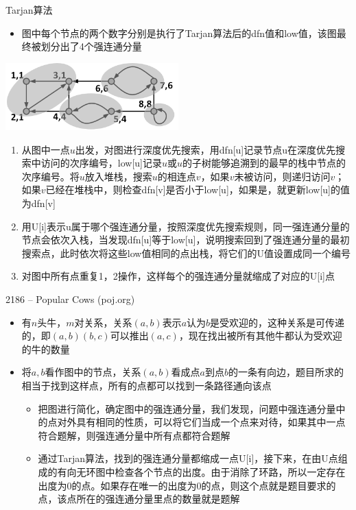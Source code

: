 \begin{frame}{Tarjan算法}
    \begin{itemize}
        \item 图中每个节点的两个数字分别是执行了Tarjan算法后的dfn值和low值，该图最终被划分出了4个强连通分量
    \end{itemize}
    \vfill
    \includegraphics[width=0.5\textwidth,center]{fig/tarjan.png}
    \scriptsize{
    \begin{enumerate}[(1)]
        \item 从图中一点$u$出发，对图进行深度优先搜索，用dfn[u]记录节点u在深度优先搜索中访问的次序编号，low[u]记录$u$或$u$的子树能够追溯到的最早的栈中节点的次序编号。将$u$放入堆栈，搜索$u$的相连点$v$，如果$v$未被访问，则递归访问$v$；如果$v$已经在堆栈中，则检查dfn[v]是否小于low[u]，如果是，就更新low[u]的值为dfn[v]
        \item 用U[i]表示u属于哪个强连通分量，按照深度优先搜索规则，同一强连通分量的节点会依次入栈，当发现dfn[u]等于low[u]，说明搜索回到了强连通分量的最初搜索点，此时依次将这些low值相同的点出栈，将它们的U值设置成同一个编号
        \item 对图中所有点重复1，2操作，这样每个的强连通分量就缩成了对应的U[i]点
    \end{enumerate}}
\end{frame}
\begin{frame}{2186 -- Popular Cows (poj.org)}
    \begin{itemize}
        \item 有$n$头牛，$m$对关系，关系$(a,b)$表示$a$认为$b$是受欢迎的，这种关系是可传递的，即$(a,b)(b,c)$可以推出$(a,c)$，现在找出被所有其他牛都认为受欢迎的牛的数量
        \item 将$a,b$看作图中的节点，关系$(a,b)$看成点$a$到点$b$的一条有向边，题目所求的相当于找到这样点，所有的点都可以找到一条路径通向该点
        \begin{itemize}
            \item 把图进行简化，确定图中的强连通分量，我们发现，问题中强连通分量中的点对外具有相同的性质，可以将它们当成一个点来对待，如果其中一点符合题解，则强连通分量中所有点都符合题解
            \item 通过Tarjan算法，找到的强连通分量都缩成一点U[i]，接下来，在由U点组成的有向无环图中检查各个节点的出度。由于消除了环路，所以一定存在出度为0的点。如果存在唯一的出度为0的点，则这个点就是题目要求的点，该点所在的强连通分量里点的数量就是题解
        \end{itemize}
    \end{itemize}
\end{frame}
